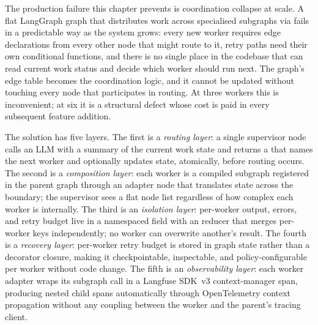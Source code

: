 

The production failure this chapter prevents is coordination collapse at
scale. A flat LangGraph graph that distributes work across specialised
subgraphs via  fails in a predictable way
as the system grows: every new worker requires edge declarations from every
other node that might route to it, retry paths need their own conditional
functions, and there is no single place in the codebase that can read
current work status and decide which worker should run next. The graph's
edge table becomes the coordination logic, and it cannot be updated without
touching every node that participates in routing. At three workers this is
inconvenient; at six it is a structural defect whose cost is paid in every
subsequent feature addition.

The solution has five layers. The first is a \emph{routing layer}: a
single supervisor node calls an LLM with a summary of the current work
state and returns a  that names the next worker and
optionally updates state, atomically, before routing occurs. The second is
a \emph{composition layer}: each worker is a compiled subgraph registered
in the parent graph through an adapter node that translates state across
the boundary; the supervisor sees a flat node list regardless of how
complex each worker is internally. The third is an \emph{isolation layer}:
per-worker output, errors, and retry budget live in a namespaced
 field with an  reducer that
merges per-worker keys independently; no worker can overwrite another's
result. The fourth is a \emph{recovery layer}: per-worker retry budget is
stored in graph state rather than a decorator closure, making it
checkpointable, inspectable, and policy-configurable per worker without
code change. The fifth is an \emph{observability layer}: each worker
adapter wraps its subgraph call in a Langfuse SDK~v3 context-manager span,
producing nested child spans automatically through OpenTelemetry context
propagation without any coupling between the worker and the parent's
tracing client.

